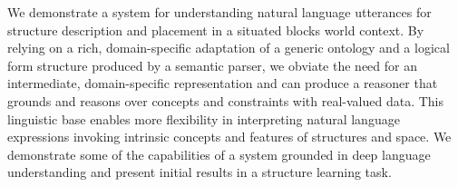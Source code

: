 We demonstrate a system for understanding natural language utterances for structure description and placement in a situated blocks world context. By relying on a rich, domain-specific adaptation of a generic ontology and a logical form structure produced by a semantic parser, we obviate the need for an intermediate, domain-specific representation and can produce a reasoner that grounds and reasons over concepts and constraints with real-valued data. This linguistic base enables more flexibility in interpreting natural language expressions invoking intrinsic concepts and features of structures and space. We demonstrate some of the capabilities of a system grounded in deep language understanding and present initial results in a structure learning task.
